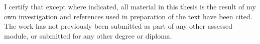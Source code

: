 \begin{declaration}

I certify that except where indicated, all material in this thesis is the result
of my own investigation and references used in preparation of the text have been
cited. The work has not previously been submitted as part of any other assessed
module, or submitted for any other degree or diploma.


\end{declaration}
